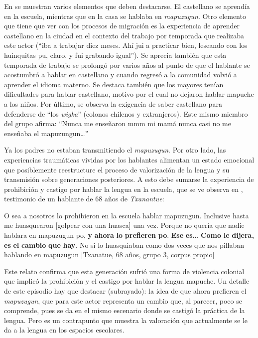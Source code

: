 \documentclass[output=paper]{../langscibook}
\begin{document}
En  se muestran varios elementos que deben destacarse. El castellano se aprendía en la escuela, mientras que en la casa se hablaba en \textit{mapuzugun}. Otro elemento que tiene que ver con los procesos de migración es la experiencia de aprender castellano en la ciudad en el contexto del trabajo por temporada que realizaba este actor (“iba a trabajar diez meses. Ahí jui a practicar bien, leseando con los huinquitas pu, claro, y fui grabando igual”). Se aprecia también que esta temporada de trabajo se prolongó por varios años al punto de que el hablante se acostumbró a hablar en castellano y cuando regresó a la comunidad volvió a aprender el idioma materno. Se destaca también que los mayores tenían dificultades para hablar castellano, motivo por el cual no dejaron hablar mapuche a los niños. Por último, se observa la exigencia de saber castellano para defenderse de “los \textit{wigka}” (colonos chilenos y extranjeros). Este mismo miembro del grupo afirma: “Nunca me enseñaron mmm mi mamá nunca casi no me enseñaba el mapuzungun…”

Ya los padres no estaban transmitiendo el \textit{mapuzugun}. Por otro lado, las experiencias traumáticas vividas por los hablantes alimentan un estado emocional que posiblemente reestructure el proceso de valorización de la lengua y su transmisión sobre generaciones posteriores. A esto debe sumarse la experiencia de prohibición y castigo por hablar la lengua en la escuela, que se ve observa en , testimonio de un hablante de 68 años de \textit{Txanantue}:

\ea\label{ex:olate:7}
 O sea a nosotros lo prohibieron en la escuela hablar mapuzugun. Inclusive hasta me huasquearon [golpear con una huasca] una vez. Porque no quería que nadie hablara en mapuzugun po, \textbf{y} \textbf{ahora} \textbf{lo} \textbf{prefieren} \textbf{po}. \textbf{Ese} \textbf{es…} \textbf{Como} \textbf{le} \textbf{dijera,} \textbf{es} \textbf{el} \textbf{cambio} \textbf{que} \textbf{hay}. No si lo huasquiaban como dos veces que nos pillaban hablando en mapuzugun  \textup{[Txanatue, 68 años, grupo 3, corpus propio]}
 \z

Este relato confirma que esta generación sufrió una forma de violencia colonial que implicó la prohibición y el castigo por hablar la lengua mapuche. Un detalle de este episodio hay que destacar (subrayado): la idea de que ahora prefieren el \textit{mapuzugun}, que para este actor representa un cambio que, al parecer, poco se comprende, pues se da en el mismo escenario donde se castigó la práctica de la lengua. Pero es un contrapunto que muestra la valoración que actualmente se le da a la lengua en los espacios escolares.
\end{document}
